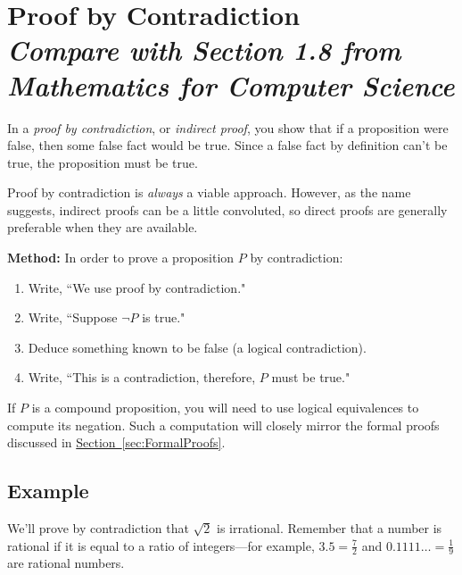 \documentclass[11pt,oneside]{book}
\theoremstyle{definition}
\begin{document}
\section[Proof by Contradiction]{Proof by Contradiction\\[0.5ex]
\normalsize\normalfont\textit{
    Compare with Section 1.8 from \emph{Mathematics for Computer Science}
}}
In a \emph{proof by contradiction}, or \emph{indirect proof}, you show that if a proposition were false, then some false fact would be true.
Since a false fact by definition can't be true, the proposition must be true.

Proof by contradiction is \emph{always} a viable approach.
However, as the name suggests, indirect proofs can be a little convoluted, so direct proofs are generally preferable when they are available.

\textbf{Method:} In order to prove a proposition $P$ by contradiction:
\begin{enumerate}
    \item Write, ``We use proof by contradiction."
    \item Write, ``Suppose $\lnot P$ is true."
    \item Deduce something known to be false (a logical contradiction).
    \item Write, ``This is a contradiction, therefore, $P$ must be true."
\end{enumerate}

If $P$ is a compound proposition, you will need to use logical equivalences to compute its negation.
Such a computation will closely mirror the formal proofs discussed in \hyperref[sec:FormalProofs]{Section~\ref*{sec:FormalProofs}}.

\subsection*{Example}
We'll prove by contradiction that $\sqrt{2}$ is irrational.
Remember that a number is rational if it is equal to a ratio of integers—for example, $3.5 = \frac{7}{2}$ and $0.1111\dots = \frac{1}{9}$ are rational numbers.
\end{document}
